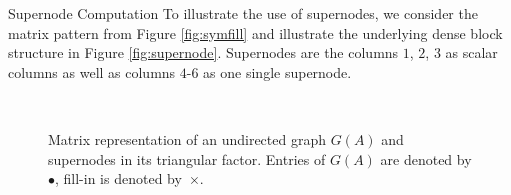 \begin{example}{Supernode Computation}\label{exm:supernode_computation}
To illustrate the use of supernodes, we consider the matrix pattern
from Figure \ref{fig:symfill} and illustrate the underlying
dense block structure in Figure \ref{fig:supernode}.
Supernodes are the columns $1$, $2$, $3$ as scalar columns as well as columns
$4$-$6$ as one single supernode.
\end{example}
\begin{figure}
   \centering
    \, \hspace{0.5cm}
   \caption{Matrix representation of an undirected graph $G(A)$ and supernodes in its triangular factor. Entries of $G(A)$ are denoted by $\bullet$, fill-in is denoted by~$\times$.}
\end{figure}

